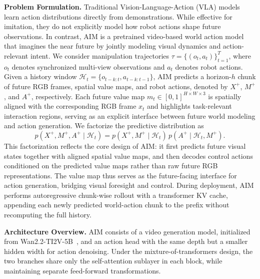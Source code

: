 \documentclass{article}
\newcommand{\method}{AIM\xspace}
\begin{document}
\noindent\textbf{Problem Formulation.}
Traditional Vision-Language-Action (VLA) models~\cite{pi0,pi05,atomvla,llava-vla,openvla,rt2} learn action distributions directly from demonstrations. While effective for imitation, they do not explicitly model how robot actions shape future observations. In contrast, \method is a pretrained video-based world action model that imagines the near future by jointly modeling visual dynamics and action-relevant intent.
We consider manipulation trajectories $\tau=\{(o_t,a_t)\}_{t=1}^{T}$, where $o_t$ denotes synchronized multi-view observations and $a_t$ denotes robot actions. Given a history window $\mathcal{H}_t=\{o_{t-k:t}, a_{t-k:t-1}\}$, \method predicts a horizon-$h$ chunk of future RGB frames, spatial value maps, and robot actions, denoted by $X^+$, $M^+$, and $A^+$, respectively. Each future value map $m_t \in [0,1]^{H \times W \times 3}$ is spatially aligned with the corresponding RGB frame $x_t$ and highlights task-relevant interaction regions, serving as an explicit interface between future world modeling and action generation. We factorize the predictive distribution as
\begin{equation}
p(X^+, M^+, A^+ \mid \mathcal{H}_t)
=
p(X^+, M^+ \mid \mathcal{H}_t)\,
p(A^+ \mid \mathcal{H}_t, M^+).
\end{equation}
This factorization reflects the core design of \method: it first predicts future visual states together with aligned spatial value maps, and then decodes control actions conditioned on the predicted value maps rather than raw future RGB representations. The value map thus serves as the future-facing interface for action generation, bridging visual foresight and control. During deployment, \method performs autoregressive chunk-wise rollout with a transformer KV cache, appending each newly predicted world-action chunk to the prefix without recomputing the full history.

\noindent\textbf{Architecture Overview.}
\method consists of a video generation model, initialized from Wan2.2-TI2V-5B~\cite{wan2025wan}, and an action head with the same depth but a smaller hidden width for action denoising. Under the mixture-of-transformers design, the two branches share only the self-attention sublayer in each block, while maintaining separate feed-forward transformations.
\end{document}
